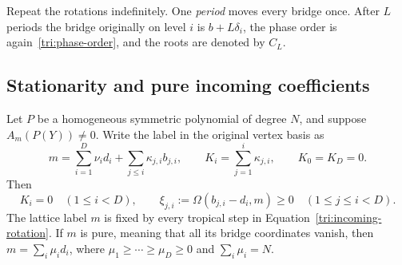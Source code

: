 Repeat the rotations indefinitely.  One \emph{period} moves every
bridge once.  After $L$ periods the bridge originally on level $i$ is
$b+L\delta_i$, the phase order is again~\eqref{tri:phase-order}, and
the roots are denoted by $C_L$.

\subsection{Stationarity and pure incoming coefficients}

\begin{lemma}\label{tri:stationary}
Let $P$ be a homogeneous symmetric polynomial of degree $N$, and
suppose $A_m(P(Y))\ne0$.
Write the label in the original vertex basis as
\[
 m=\sum_{i=1}^D\nu_i d_i+\sum_{j\leq i}\kappa_{j,i}b_{j,i},
 \qquad K_i=\sum_{j=1}^i\kappa_{j,i},\qquad K_0=K_D=0.
\]
Then
\begin{equation}\label{tri:stationary-conditions}
 K_i=0\quad(1\leq i<D),\qquad
 \xi_{j,i}:=\Omega(b_{j,i}-d_i,m)\geq0\quad(1\leq j\leq i<D).
\end{equation}
The lattice label $m$ is fixed by every tropical step in
Equation~\eqref{tri:incoming-rotation}.
If $m$ is pure, meaning that all its bridge coordinates vanish, then
$m=\sum_i\mu_i d_i$, where
$\mu_1\geq\cdots\geq\mu_D\geq0$ and $\sum_i\mu_i=N$.
\end{lemma}

